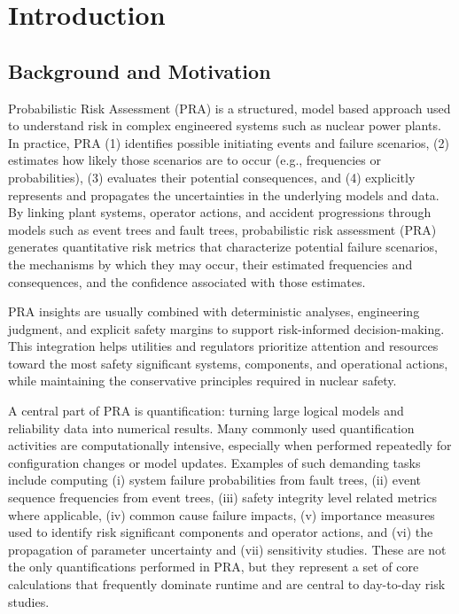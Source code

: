 \chapter{Introduction}
\label{chap:introduction}

\section{Background and Motivation}

Probabilistic Risk Assessment (PRA) is a structured, model based approach used to understand risk in complex engineered systems such as nuclear power plants. In practice, PRA (1) identifies possible initiating events and failure scenarios, (2) estimates how likely those scenarios are to occur (e.g., frequencies or probabilities), (3) evaluates their potential consequences, and (4) explicitly represents and propagates the uncertainties in the underlying models and data. By linking plant systems, operator actions, and accident progressions through models such as event trees and fault trees, probabilistic risk assessment (PRA) generates quantitative risk metrics that characterize potential failure scenarios, the mechanisms by which they may occur, their estimated frequencies and consequences, and the confidence associated with those estimates.

PRA insights are usually combined with deterministic analyses, engineering judgment, and explicit safety margins to support risk-informed decision-making. This integration helps utilities and regulators prioritize attention and resources toward the most safety significant systems, components, and operational actions, while maintaining the conservative principles required in nuclear safety.

A central part of PRA is quantification: turning large logical models and reliability data into numerical results. Many commonly used quantification activities are computationally intensive, especially when performed repeatedly for configuration changes or model updates. Examples of such demanding tasks include computing (i) system failure probabilities from fault trees, (ii) event sequence frequencies from event trees, (iii) safety integrity level related metrics where applicable, (iv) common cause failure impacts, (v) importance measures used to identify risk significant components and operator actions, and (vi) the propagation of parameter uncertainty and (vii) sensitivity studies. These are not the only quantifications performed in PRA, but they represent a set of core calculations that frequently dominate runtime and are central to day-to-day risk studies.

